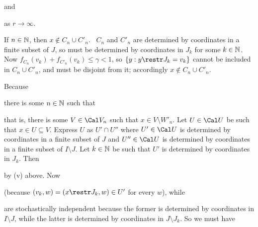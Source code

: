 {

\noindent and


\noindent as $r\to\infty$.\ \Qed

\medskip

 If $n\in\Bbb N$, then $x\notin C_n\cup C'_n$.   \Prf\
$C_n$ and $C'_n$ are determined by coordinates in a finite subset of
$J$, so must be
determined by coordinates in $J_k$ for some $k\in\Bbb N$.   Now
$f_{C_n}(v_k)+f_{C'_n}(v_k)\le\gamma<1$, so $\{y:y\restr J_k=v_k\}$
cannot be included in $C_n\cup C'_n$, and must be disjoint from it;
accordingly $x\notin C_n\cup C'_n$.\ \Qed

\medskip

 Because


\noindent there is some $n\in\Bbb N$ such that


\noindent that is, there is some $V\in\Cal V_n$ such that
$x\in V\setminus W'_n$.   Let $U\in\Cal U$ be such that
$x\in U\subseteq V$.   Express
$U$ as $U'\cap U''$ where $U'\in\Cal U$ is determined by coordinates in
a finite subset of $J$ and $U''\in\Cal U$ is determined by coordinates
in a finite subset of $I\setminus J$.   Let $k\in\Bbb N$ be such that
$U'$ is determined by coordinates in $J_k$.   Then


\noindent by (v) above.   Now


\noindent (because $(v_k,w)=(x\restr J_k,w)\in U'$ for every $w$), while


\noindent are stochastically independent because the former is determined by
coordinates in $I\setminus J$, while the latter is determined by coordinates in $J\setminus J_k$.   So we must have

}
